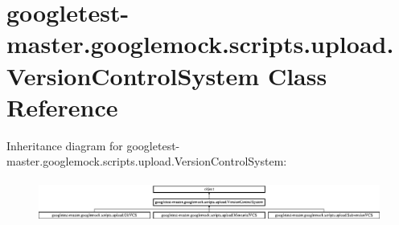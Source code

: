 \hypertarget{classgoogletest-master_1_1googlemock_1_1scripts_1_1upload_1_1_version_control_system}{}\section{googletest-\/master.googlemock.\+scripts.\+upload.\+Version\+Control\+System Class Reference}
\label{classgoogletest-master_1_1googlemock_1_1scripts_1_1upload_1_1_version_control_system}
Inheritance diagram for googletest-\/master.googlemock.\+scripts.\+upload.\+Version\+Control\+System\+:\begin{figure}[H]
\begin{center}
\leavevmode
\includegraphics[height=1.386139cm]{d6/d87/classgoogletest-master_1_1googlemock_1_1scripts_1_1upload_1_1_version_control_system}
\end{center}
\end{figure}
